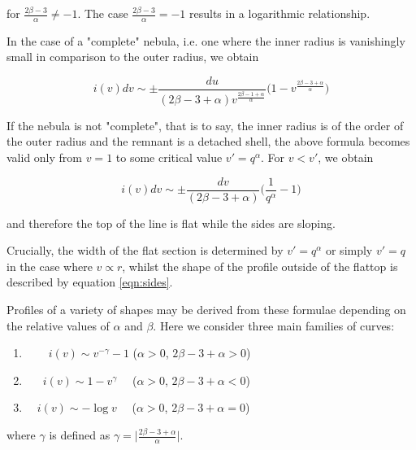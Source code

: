 \documentclass[useAMS,usenatbib,usegraphicx]{mnras}
\begin{document}
\noindent for $\frac{2\beta-3}{\alpha} \neq -1$.  The case 
$\frac{2\beta-3}{\alpha} = -1$ results in a logarithmic relationship.


In the case of a "complete" nebula, i.e. one where the inner radius is 
vanishingly small in comparison to the outer radius, we obtain

\begin{equation}
\label{eqn:sides}
	i(v) dv \sim \pm \frac{du}{(2\beta-3+\alpha) v^{\frac{2\beta-1+\alpha}{\alpha}}} \Big(1-v^{\frac{2\beta-3+\alpha}{\alpha}} \Big)
\end{equation}

If the nebula is not "complete", that is to say, the inner radius is of the order of the outer radius and the remnant is a detached shell, the above formula becomes valid only from $v=1$ to some critical value $v'=q^\alpha$. For $v<v'$, we obtain

\begin{equation}
i(v)dv \sim \pm \frac{dv}{(2\beta-3+\alpha)} \Big( \frac{1}{q^\alpha} - 1 \Big)
\end{equation}

\noindent and therefore the top of the line is flat while the sides are 
sloping.

Crucially, the width of the flat section is determined by $v'=q^\alpha$ or 
simply $v'=q$ in the case where $v \propto r$, whilst the shape of the 
profile outside of the flattop is described by equation \ref{eqn:sides}.

Profiles of a variety of shapes may be derived from these formulae 
depending on the relative values of $\alpha$ and $\beta$.  Here we 
consider three main families of curves:


\begin{enumerate}\parskip3pt

	\item \ \ $\quad i(v)  \sim v^{-\gamma}-1$ \quad ($\alpha>0$, $2\beta-3+\alpha>0$)
	\item \ $\quad i(v)  \sim 1-v^\gamma$ \quad \ \ ($\alpha>0$, $2\beta-3+\alpha<0$)
	\item  $\quad i(v) \sim -\log v$ \quad \ \ ($\alpha>0$, $2\beta-3+\alpha=0$)

\end{enumerate}


\noindent where $\gamma$ is defined as $\gamma= \lvert 
\frac{2\beta-3+\alpha}{\alpha} \rvert$.
\end{document}
